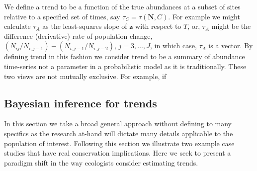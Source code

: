 \documentclass[12pt,letter,draft]{article}
\newcommand{\Nij}{\ensuremath{N_{ij}}}
\begin{document}
We define a trend to be a function of the true abundances at a subset of sites relative to a specified set of times, say $\tau_C=\tau(\mathbf{N}, C)$. For example we might calculate $\tau_A$ as the least-squares slope of $\mathbf{z}$ with respect to $T$, or, $\tau_A$ might be the difference (derivative) rate of population change, $(\Nij/N_{i,j-1}) - (N_{i,j-1}/N_{i,j-2})$, $j=3,\dots,J$, in which case, $\tau_A$ is a vector. By defining trend in this fashion we consider trend to be a summary of abundance time-series not a parameter in a probabilistic model as it is traditionally. These two views are not mutually exclusive. For example, if 
 
\subsection{Bayesian inference for trends}

In this section we take a broad general approach without defining to many specifics as the research at-hand will dictate many details applicable to the population of interest. Following this section we illustrate two example case studies that have real conservation implications. Here we seek to present a paradigm shift in the way ecologists consider estimating trends. 
\end{document}
